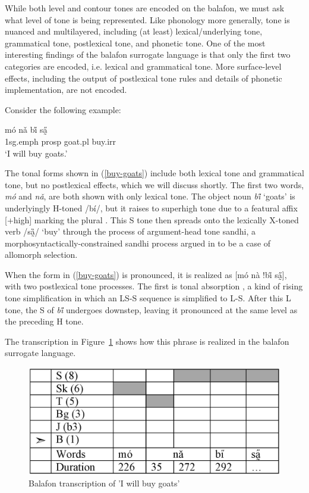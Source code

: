 \documentclass[output=paper]{langscibook}
\begin{document}
While both level and contour tones are encoded on the balafon, we must ask what level of tone is being represented. Like phonology more generally, tone is nuanced and multilayered, including (at least) lexical/underlying tone, grammatical tone, postlexical tone, and phonetic tone. One of the most interesting findings of the balafon surrogate language is that only the first two categories are encoded, i.e. lexical and grammatical tone. More surface-level effects, including the output of postlexical tone rules and details of phonetic implementation, are not encoded. 

Consider the following example:

\ea\label{buy-goats}
\gll mó nǎ bi̋ sa̰̋   \\
{\sc 1sg.emph} {\sc prosp} goat.{\sc pl} buy.{\sc irr} \\
\glt `I will buy goats.' \\
\z

The tonal forms shown in (\ref{buy-goats}) include both lexical tone and grammatical tone, but no postlexical effects, which we will discuss shortly. The first two words, \textit{mó} and \textit{nǎ}, are both shown with only lexical tone. The object noun \textit{bi̋} `goats' is underlyingly H-toned /bí/, but it raises to superhigh tone due to a featural affix [+high] marking the plural \citep{McPherson2017morphology,McPherson2017acal}. This S tone then spreads onto the lexically X-toned verb /sȁ̰/ `buy' through the process of argument-head tone sandhi, a morphosyntactically-constrained sandhi process argued in \citet{McPherson2019c} to be a case of allomorph selection.

When the form in (\ref{buy-goats}) is pronounced, it is realized as [mó nà !bi̋ sa̰̋], with two postlexical tone processes. The first is tonal absorption   \citep{HymanSchuh1974}, a kind of rising tone simplification in which an LS-S sequence is simplified to L-S. After this L tone, the S of \textit{bi̋} undergoes downstep, leaving it pronounced at the same level as the preceding H tone.

The transcription in Figure~\ref{buy-goats-balafon} shows how this phrase is realized in the balafon surrogate language.


\begin{figure}
  \includegraphics[scale=.5]{figures/i-will-buy-goats.eps}
  \caption{Balafon transcription of 'I will buy goats'}\label{buy-goats-balafon} 
\end{figure}
\end{document}
